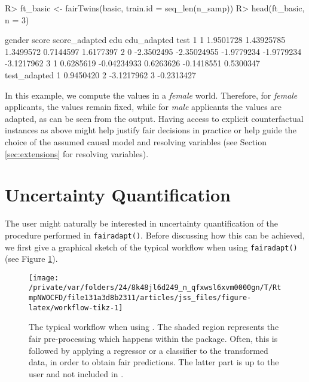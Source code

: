 \documentclass[
  nojss]{jss}
\begin{document}
\begin{CodeChunk}
\begin{CodeInput}
R> ft_basic <- fairTwins(basic, train.id = seq_len(n_samp))
R> head(ft_basic, n = 3)
\end{CodeInput}
\begin{CodeOutput}
  gender      score score_adapted        edu edu_adapted       test
1      1  1.9501728    1.43925785  1.3499572   0.7144597  1.6177397
2      0 -2.3502495   -2.35024955 -1.9779234  -1.9779234 -3.1217962
3      1  0.6285619   -0.04234933  0.6263626  -0.1418551  0.5300347
  test_adapted
1    0.9450420
2   -3.1217962
3   -0.2313427
\end{CodeOutput}
\end{CodeChunk}

In this example, we compute the values in a \emph{female} world.
Therefore, for \emph{female} applicants, the values remain fixed, while
for \emph{male} applicants the values are adapted, as can be seen from
the output. Having access to explicit counterfactual instances as above
might help justify fair decisions in practice or help guide the choice
of the assumed causal model and resolving variables (see Section
\ref{sec:extensions} for resolving variables).

\hypertarget{sec:uncq}{%
\section{Uncertainty Quantification}\label{sec:uncq}}

The user might naturally be interested in uncertainty quantification of
the procedure performed in \texttt{fairadapt()}. Before discussing how
this can be achieved, we first give a graphical sketch of the typical
workflow when using \texttt{fairadapt()} (see Figure
\ref{fig:workflow-tikz}).

\begin{CodeChunk}
\begin{figure}

{\centering \texttt{[image: /private/var/folders/24/8k48jl6d249\_n\_qfxwsl6xvm0000gn/T/RtmpNWOCFD/file131a3d8b2311/articles/jss\_files/figure-latex/workflow-tikz-1]} 

}

\caption{The typical workflow when using . The shaded region represents the fair pre-processing which happens within the  package. Often, this is followed by applying a regressor or a classifier to the transformed data, in order to obtain fair predictions. The latter part is up to the user and not included in .}\label{fig:workflow-tikz}
\end{figure}
\end{CodeChunk}
\end{document}
